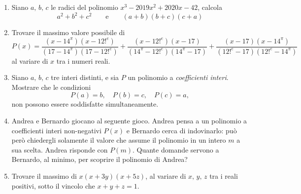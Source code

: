 \documentclass[a4paper]{article}
\theoremstyle{remark}
\theoremstyle{definition}
\begin{document}
\begin{enumerate}
	\item  Siano $ a, \, b, \, c $ le radici del polinomio $ x^3 -2019x^2 + 2020x - 42 $, calcola 
	\[ a^2 + b^2 + c^2 \qquad\text{e}\qquad (a+b)(b+c)(c+a)\]
	
	\item  Trovare il massimo valore possibile di
	\[ P(x) = \frac{(x-14^\pi)(x-12!^e)}{(17-14^\pi)(17-12!^e)} 
	+\frac{(x-12!^e)(x-17)}{(14^\pi-12!^e)(14^\pi-17)} +\frac{(x-17)(x-14^\pi)}{(12!^e-17)(12!^e-14^\pi)} \]
	al variare di $ x $ tra i numeri reali.
	
	\item Siano $ a,\, b,\, c $ tre interi distinti, e sia $ P $ un polinomio a \emph{coefficienti interi}. Mostrare che le condizioni $$  P(a) = b,\quad P(b) = c,\quad P(c) = a,  $$ non possono essere soddisfatte simultaneamente.
	
	\item Andrea e Bernardo giocano al seguente gioco. Andrea pensa a un polinomio a coefficienti interi non-negativi $ P(x) $ e Bernardo cerca di indovinarlo: può però chiedergli solamente il valore che assume il polinomio in un intero $ m $ a sua scelta. Andrea risponde con $ P(m) $. Quante domande servono a Bernardo, al minimo, per scoprire il polinomio di Andrea?
	
	\item Trovare il massimo di $ x(x + 3y)(x + 5z) $, al variare di $ x, \, y, \, z $ tra i reali positivi, sotto il vincolo che $ x + y +z = 1 $.
	
	
\end{enumerate}
\end{document}
